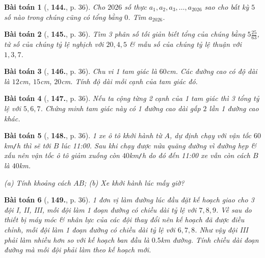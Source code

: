 \documentclass{article}
\newtheorem{baitoan}{Bài toán}
\begin{document}
\begin{baitoan}[\cite{Tuyen_Toan_7}, \textbf{144.}, p. 36]
	Cho $2026$ số thực $a_1,a_2,a_3,\ldots,a_{2026}$ sao cho bất kỳ $5$ số nào trong chúng cũng có tổng bằng $0$. Tìm $a_{2026}$.
\end{baitoan}

\begin{baitoan}[\cite{Tuyen_Toan_7}, \textbf{145.}, p. 36]
	Tìm 3 phân số tối giản biết tổng của chúng bằng $5\frac{25}{63}$, tử số của chúng tỷ lệ nghịch với $20,4,5$ \& mẫu số của chúng tỷ lệ thuận với $1,3,7$.
\end{baitoan}

\begin{baitoan}[\cite{Tuyen_Toan_7}, \textbf{146.}, p. 36]
	Chu vi 1 tam giác là $60$\emph{cm}. Các đường cao có độ dài là $12$\emph{cm}, $15$\emph{cm}, $20$\emph{cm}. Tính độ dài mỗi cạnh của tam giác đó.
\end{baitoan}

\begin{baitoan}[\cite{Tuyen_Toan_7}, \textbf{147.}, p. 36]
	Nếu ta cộng từng 2 cạnh của 1 tam giác thì 3 tổng tỷ lệ với $5,6,7$. Chứng minh tam giác này có 1 đường cao dài gấp $2$ lần 1 đường cao khác.
\end{baitoan}

\begin{baitoan}[\cite{Tuyen_Toan_7}, \textbf{148.}, p. 36]
	1 xe ô tô khởi hành từ $A$, dự định chạy với vận tốc $60$\emph{km\texttt{/}h} thì sẽ tới $B$ lúc 11:00. Sau khi chạy được nửa quãng đường vì đường hẹp \& xấu nên vận tốc ô tô giảm xuống còn $40$\emph{km\texttt{/}h} do đó đến 11:00 xe vẫn còn cách $B$ là $40$\emph{km}.
	
		(a) Tính khoảng cách $AB$;
		(b) Xe khởi hành lúc mấy giờ?
	
\end{baitoan}

\begin{baitoan}[\cite{Tuyen_Toan_7}, \textbf{149.}, p. 36]
	1 đơn vị làm đường lúc đầu đặt kế hoạch giao cho 3 đội I, II, III, mỗi đội làm 1 đoạn đường có chiều dài tỷ lệ với $7,8,9$. Về sau do thiết bị máy móc \& nhân lực của các đội thay đổi nên kế hoạch đã được điều chỉnh, mỗi đội làm 1 đoạn đường có chiều dài tỷ lệ với $6,7,8$. Như vậy đội III phải làm nhiều hơn so với kế hoạch ban đầu là $0.5$\emph{km} đường. Tính chiều dài đoạn đường mà mỗi đội phải làm theo kế hoạch mới.
\end{baitoan}


\printbibliography[heading=bibintoc]
	
\end{document}
